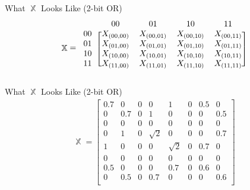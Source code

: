 \documentclass[12pt]{beamer}
\DeclareMathOperator{\X}{\mathbb{X}}		     %
\begin{document}
\begin{frame}{What $\X$ Looks Like (2-bit OR)}
    \begin{align}
\X = \begin{blockarray}{ccccc}
\qquad & 00 & 01 & 10 & 11 \\
\begin{block}{c[cccc]}
  00 & X_{(00,00)} & X_{(00,01)} & X_{(00,10)} & X_{(00,11)}\\
  01 & X_{(01,00)} & X_{(01,01)} & X_{(01,10)} & X_{(01,11)}\\
  10 & X_{(10,00)} & X_{(10,01)} & X_{(10,10)} & X_{(10,11)}\\
  11 & X_{(11,00)} & X_{(11,01)} & X_{(11,10)} & X_{(11,11)}\\
\end{block}
\end{blockarray} \nonumber 
\end{align}
\end{frame}

\begin{frame}{What $\X$ Looks Like (2-bit OR)}
    \begin{align}
    \X = \left[ \begin{array}{cc|cc|cc|cc}
    0.7 & 0 & 0 & 0 & 1 & 0 & 0.5 & 0\\
    0 & 0.7 & 0 & 1 & 0 & 0 & 0 & 0.5\\
    \hline
    0 & 0 & 0 & 0 & 0 & 0 & 0 & 0\\
    0 & 1 & 0 & \sqrt{2} & 0 & 0 & 0 & 0.7\\
    \hline
    1 & 0 & 0 & 0 & \sqrt{2} & 0 & 0.7 & 0\\
    0 & 0 & 0 & 0 & 0 & 0 & 0 & 0\\
    \hline
    0.5 & 0 & 0 & 0 & 0.7 & 0 & 0.6 & 0\\
    0 & 0.5 & 0 & 0.7 & 0 & 0 & 0 & 0.6\\
    \end{array}
\right] \nonumber
\end{align}
\end{frame}
\end{document}
